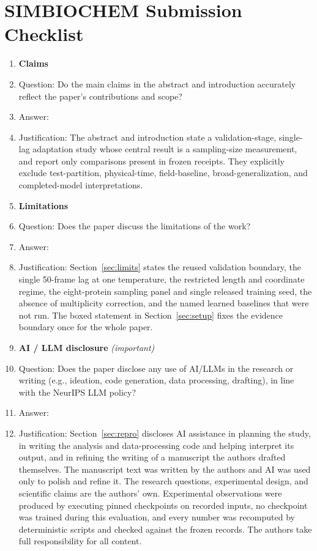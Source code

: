 \section*{SIMBIOCHEM Submission Checklist}

\begin{enumerate}

\item {\bf Claims}
    \item[] Question: Do the main claims in the abstract and introduction accurately reflect the paper's contributions and scope?
    \item[] Answer: \answerYes{}
    \item[] Justification: The abstract and introduction state a validation-stage, single-lag adaptation study whose central result is a sampling-size measurement, and report only comparisons present in frozen receipts. They explicitly exclude test-partition, physical-time, field-baseline, broad-generalization, and completed-model interpretations.

\item {\bf Limitations}
    \item[] Question: Does the paper discuss the limitations of the work?
    \item[] Answer: \answerYes{}
    \item[] Justification: Section~\ref{sec:limits} states the reused validation boundary, the single 50-frame lag at one temperature, the restricted length and coordinate regime, the eight-protein sampling panel and single released training seed, the absence of multiplicity correction, and the named learned baselines that were not run. The boxed statement in Section~\ref{sec:setup} fixes the evidence boundary once for the whole paper.

\item {\bf AI / LLM disclosure} \emph{(important)}
    \item[] Question: Does the paper disclose any use of AI/LLMs in the research or writing (e.g., ideation, code generation, data processing, drafting), in line with the NeurIPS LLM policy?
    \item[] Answer: \answerYes{}
    \item[] Justification: Section~\ref{sec:repro} discloses AI assistance in planning the study, in writing the analysis and data-processing code and helping interpret its output, and in refining the writing of a manuscript the authors drafted themselves. The manuscript text was written by the authors and AI was used only to polish and refine it. The research questions, experimental design, and scientific claims are the authors' own. Experimental observations were produced by executing pinned checkpoints on recorded inputs, no checkpoint was trained during this evaluation, and every number was recomputed by deterministic scripts and checked against the frozen records. The authors take full responsibility for all content.


\end{enumerate}
